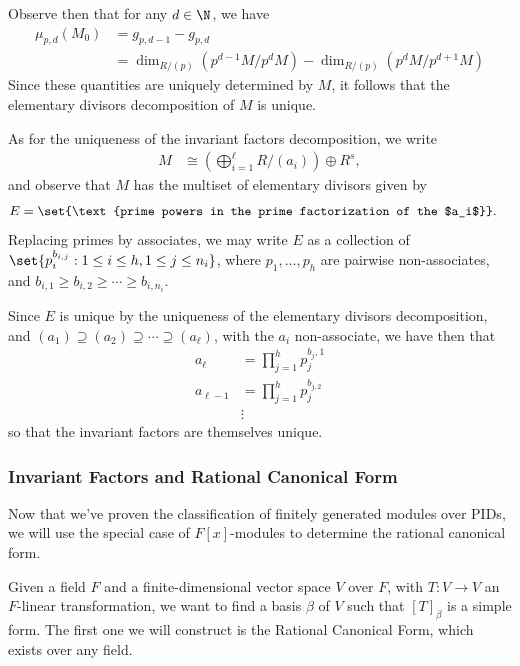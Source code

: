 \documentclass[10pt]{mypackage}
\begin{document}
Observe then that for any $d\in\N$, we have
\begin{align*}
  \mu_{p,d}\left( M_0 \right) &= g_{p,d-1}-g_{p,d}\\
                              &= \dim_{R/\left( p \right)}\left( p^{d-1}M/p^{d}M \right) - \dim_{R/\left( p \right)}\left( p^dM/p^{d+1}M \right)
\end{align*}
Since these quantities are uniquely determined by $M$, it follows that the elementary divisors decomposition of $M$ is unique.

As for the uniqueness of the invariant factors decomposition, we write
\begin{align*}
  M &\cong \left( \bigoplus_{i=1}^{\ell}R/\left( a_i \right) \right)\oplus R^{s},
\end{align*}
and observe that $M$ has the multiset of elementary divisors given by
\begin{align*}
  E &= \set{\text{prime powers in the prime factorization of the $a_i$}}.
\end{align*}
Replacing primes by associates, we may write $E$ as a collection of $\set{p_{i}^{b_{i,j}} : 1\leq i \leq h, 1\leq j \leq n_{i}}$, where $p_1,\dots,p_h$ are pairwise non-associates, and $b_{i,1}\geq b_{i,2}\geq\cdots\geq b_{i,n_i}$.

Since $E$ is unique by the uniqueness of the elementary divisors decomposition, and $\left( a_1 \right)\supseteq \left( a_2 \right)\supseteq\cdots\supseteq \left( a_{\ell} \right)$, with the $a_i$ non-associate, we have then that
\begin{align*}
  a_{\ell} &= \prod_{j=1}^{h}p_j^{b_j,1}\\
  a_{\ell - 1} &= \prod_{j=1}^{h} p_j^{b_{j,2}}\\
               &\vdots
\end{align*}
so that the invariant factors are themselves unique.
\subsubsection{Invariant Factors and Rational Canonical Form}%
Now that we've proven the classification of finitely generated modules over PIDs, we will use the special case of $F[x]$-modules to determine the rational canonical form.

Given a field $F$ and a finite-dimensional vector space $V$ over $F$, with $T\colon V\rightarrow V$ an $F$-linear transformation, we want to find a basis $\beta$ of $V$ such that $\left[ T \right]_{\beta}$ is a simple form. The first one we will construct is the Rational Canonical Form, which exists over any field.
\end{document}

